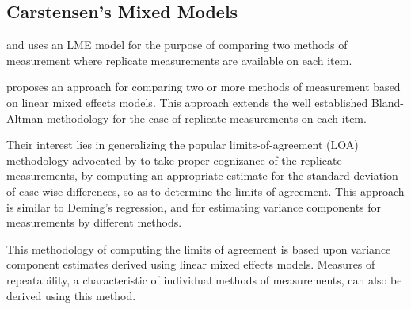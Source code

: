 \documentclass[12pt, a4paper]{report}
\theoremstyle{plain}
\theoremstyle{definition}
\theoremstyle{remark}
\begin{document}
\subsection{Carstensen's Mixed Models}


\citet{BXC2004} and \citet{BXC2008} uses an LME model for the purpose of comparing two methods of measurement where replicate measurements are available on each item. 

\citet{BXC2008} proposes an approach for comparing two or more methods of measurement based on linear mixed effects models. This approach extends the well established Bland-Altman methodology for the case of replicate measurements on each item. 

Their interest lies in generalizing the popular limits-of-agreement (LOA) methodology advocated by \citet{BA86} to take proper cognizance of the replicate measurements, by computing an appropriate estimate for the standard deviation of case-wise differences, so as to determine the limits of agreement.  This approach is similar to Deming's regression, and for estimating variance components for measurements by different methods. 

This methodology of computing the limits of
agreement is based upon variance component estimates derived using linear mixed effects models. Measures of repeatability, a characteristic of individual methods of measurements, can also be derived using this method.















\end{document}

